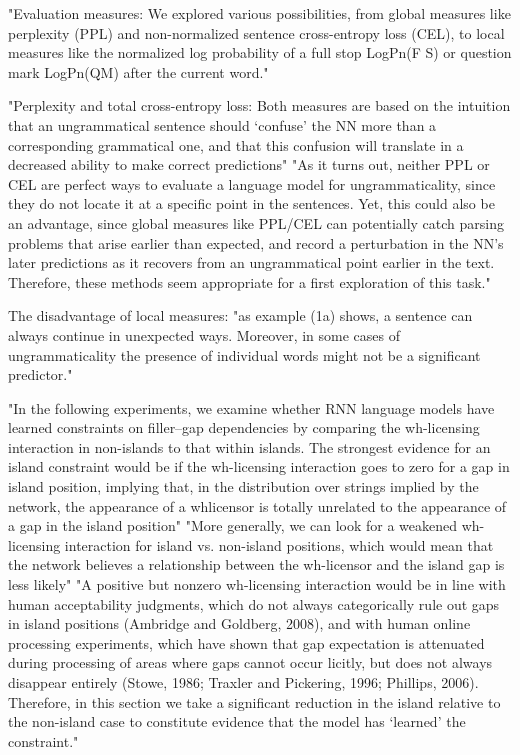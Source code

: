 "Evaluation measures: We explored various possibilities, from global measures like perplexity (PPL) and non-normalized sentence cross-entropy loss (CEL), to local measures like the normalized log probability of a full stop
LogPn(F S) or question mark LogPn(QM) after the current word." \citep{chowdhury2018rnn}

"Perplexity and total cross-entropy loss: Both measures are based on the intuition that an ungrammatical sentence should ‘confuse’ the NN more than a corresponding grammatical one, and that this confusion will translate in a decreased ability to make correct predictions"  \citep{chowdhury2018rnn}
"As it turns out, neither PPL or CEL are perfect ways to evaluate a language model for ungrammaticality, since they do not locate it at a specific point in the sentences. Yet, this could also be an advantage,
since global measures like PPL/CEL can potentially catch parsing problems that arise earlier than expected, and record a perturbation in the NN’s later predictions as it recovers from an ungrammatical point
earlier in the text. Therefore, these methods seem appropriate for a first exploration of this task." \citep{chowdhury2018rnn}

The disadvantage of local measures: "as example (1a) shows, a sentence can always continue in unexpected ways. Moreover, in some cases of ungrammaticality the presence of individual words might not be a significant predictor." \citep{chowdhury2018rnn}

"In the following experiments, we examine whether RNN language models have learned constraints on filler–gap dependencies by comparing the wh-licensing interaction in non-islands to that within islands. The strongest evidence for an island constraint would be if the wh-licensing interaction goes to zero for a gap in island position, implying that, in the distribution over strings implied by the network, the appearance of a whlicensor is totally unrelated to the appearance of a gap in the island position"
\citep{wilcox2018rnn}
"More generally, we can
look for a weakened wh-licensing interaction for
island vs. non-island positions, which would mean
that the network believes a relationship between
the wh-licensor and the island gap is less likely"  \citep{wilcox2018rnn}
"A positive but nonzero wh-licensing interaction
would be in line with human acceptability judgments, which do not always categorically rule out
gaps in island positions (Ambridge and Goldberg,
2008), and with human online processing experiments, which have shown that gap expectation is
attenuated during processing of areas where gaps
cannot occur licitly, but does not always disappear entirely (Stowe, 1986; Traxler and Pickering,
1996; Phillips, 2006). Therefore, in this section we
take a significant reduction in the island relative to
the non-island case to constitute evidence that the
model has ‘learned’ the constraint." \citep{wilcox2018rnn}


